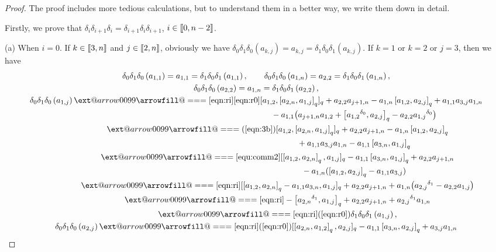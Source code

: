\documentclass[10pt,a4paper]{amsart}
\makeatletter
\def\x@arrow{\DOTSB\Relbar}
\def\xlongequalsignfill@{\arrowfill@\x@arrow\Relbar\x@arrow}
\providecommand{\xlongequal}[2][]{%
	\ext@arrow 0099\xlongequalsignfill@{#1}{#2}}
\numberwithin{equation}{section}
\def\lr#1{\left[#1\right]}
\def\lrb#1{\left(#1\right)}
\def\d{\delta}
\def\lbb#1{\left[\kern-0.15em\left[ {#1} \right] \kern-0.15em\right]}
\makeatother
\begin{document}
\begin{proof}
The proof includes more tedious calculations, but to understand them
in a better way, we write them down in detail.

Firstly, we prove that $\d_i\d_{i+1}\d_i=\d_{i+1 }\d_i\d_{i+1}$, $i \in \lbb{0,n-2}$.

(a) When $i=0$.
If $k \in \lbb{3,n}$ and $j\in\lbb{2,n}$, obviously we have
$\d_0\d_1\d_0\lrb{a_{k,j}}=a_{k,j}=\d_1\d_0\d_1\lrb{a_{k,j}}$.
If $k=1$ or $k=2$ or $j=3$, then we have
\begin{gather*}
 \d_0\d_1\d_0\lrb{a_{1,1}} =a_{1,1}=\d_1\d_0\d_1\lrb{a_{1,1}},\qquad
 \d_0\d_1\d_0\lrb{a_{1,n}}=a_{2,2}=\d_1\d_0\d_1\lrb{a_{1,n}},\\
 \d_0\d_1\d_0\lrb{a_{2,2}}=a_{1,n}=\d_1\d_0\d_1\lrb{a_{2,2}},\\
 \d_0\d_1\d_0\lrb{a_{1,j}}
 \xlongequal[\eqref{eqn:ri}]{\eqref{eqn:r0}} [a_{1,2},\lr{a_{2,n}, a_{1,j}}_q]_q+a_{2,2}a_{j+1,n}-a_{1,n}\lr{a_{1,2}, a_{2,j}}_q +a_{1,1}a_{3,j}a_{1,n} \\
\phantom{ \d_0\d_1\d_0\lrb{a_{1,j}}\xlongequal{\qquad}}{} -a_{1,1}\bigl(a_{j+1,n}a_{1,2}+\bigl[{a_{1,2}}^{\d_0}, a_{2,j}\bigr]_q -a_{2,2}{a_{1,j}}^{\d_0}\bigr) \\
 \phantom{ \d_0\d_1\d_0\lrb{a_{1,j}}}{} \xlongequal{\lrb{\ref{eqn:3b}}} [a_{1,2},\lr{a_{2,n}, a_{1,j}}_q]_q+a_{2,2}a_{j+1,n}-a_{1,n}\lr{a_{1,2}, a_{2,j}}_q \\
 \phantom{ \d_0\d_1\d_0\lrb{a_{1,j}}\xlongequal{\qquad}}{} +a_{1,1}a_{3,j}a_{1,n}-a_{1,1}\lr{a_{3,n}, a_{1,j}}_q\\
 \phantom{ \d_0\d_1\d_0\lrb{a_{1,j}}}{} \xlongequal{\eqref{equ:comm2}} [\lr{a_{1,2}, a_{2,n}}_q, a_{1,j}]_q-a_{1,1}\lr{a_{3,n}, a_{1,j}}_q+a_{2,2}a_{j+1,n}\\
 \phantom{ \d_0\d_1\d_0\lrb{a_{1,j}}\xlongequal{\qquad}}{} -a_{1,n}(\lr{a_{1,2}, a_{2,j}}_q-a_{1,1}a_{3,j}) \\
 \phantom{ \d_0\d_1\d_0\lrb{a_{1,j}}}{} \xlongequal{\eqref{eqn:ri}} [\lr{a_{1,2}, a_{2,n}}_q -a_{1,1} a_{3,n}, a_{1,j}]_q +a_{2,2}a_{j+1,n}+a_{1,n}\bigl({a_{2,j}}^{\d_1}-a_{2,2} a_{1,j}\bigr) \\
 \phantom{ \d_0\d_1\d_0\lrb{a_{1,j}}}{} \xlongequal{\eqref{eqn:ri}} -\bigl[{a_{2,n}}^{\d_1}, a_{1,j}\bigr]_q+a_{2,2}a_{j+1,n}+{a_{2,j}}^{\d_1}a_{1,n}\\
 \phantom{ \d_0\d_1\d_0\lrb{a_{1,j}}}{} \xlongequal[\eqref{eqn:ri}]{\lrb{\ref{eqn:r0}}} \d_1\d_0\d_1\lrb{a_{1,j}},\\
 \d_0\d_1\d_0\lrb{a_{2,j}} \xlongequal[\eqref{eqn:ri}]{\lrb{\ref{eqn:r0}}} [\lr{a_{2,n}, a_{1,2}}_q, a_{2,j}]_q -a_{1,1}\lr{a_{3,n}, a_{2,j}}_q +a_{3,j} a_{1,n} \\

\end{gather*}
\end{proof}
\end{document}
